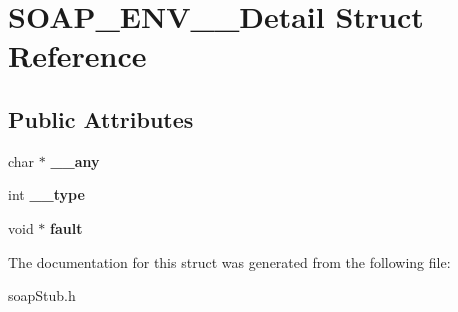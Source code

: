 \hypertarget{structSOAP__ENV____Detail}{
\section{SOAP\_\-ENV\_\-\_\-Detail Struct Reference}
\label{structSOAP__ENV____Detail}
}
\subsection*{Public Attributes}
\begin{DoxyCompactItemize}
\item 
\hypertarget{structSOAP__ENV____Detail_aec8be27bbc4e83f9f8d7ea97c034f822}{
char $\ast$ {\bfseries \_\-\_\-any}}
\label{structSOAP__ENV____Detail_aec8be27bbc4e83f9f8d7ea97c034f822}

\item 
\hypertarget{structSOAP__ENV____Detail_ae21be5af0f3f6dc47f2dbf4e35e22300}{
int {\bfseries \_\-\_\-type}}
\label{structSOAP__ENV____Detail_ae21be5af0f3f6dc47f2dbf4e35e22300}

\item 
\hypertarget{structSOAP__ENV____Detail_a159d344759c06f82eae1949aea10a1cf}{
void $\ast$ {\bfseries fault}}
\label{structSOAP__ENV____Detail_a159d344759c06f82eae1949aea10a1cf}

\end{DoxyCompactItemize}


The documentation for this struct was generated from the following file:\begin{DoxyCompactItemize}
\item 
soapStub.h\end{DoxyCompactItemize}
